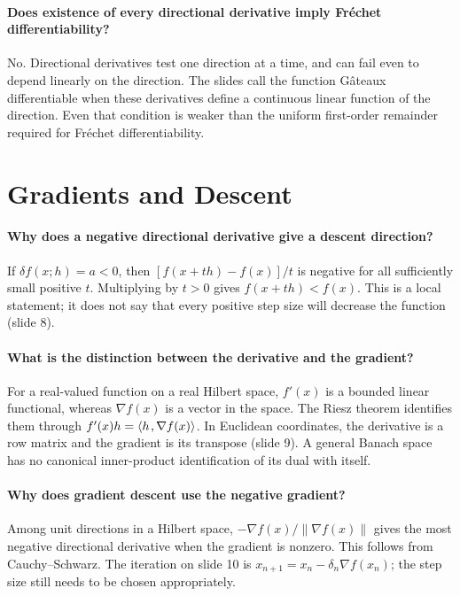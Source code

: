 \documentclass[10pt,english]{article}
\begin{document}
\paragraph{Does existence of every directional derivative imply Fr\'echet differentiability?}
No. Directional derivatives test one direction at a time, and can fail even to depend linearly on the direction.
The slides call the function G\^ateaux differentiable when these derivatives define a continuous linear function of the direction.
Even that condition is weaker than the uniform first-order remainder required for Fr\'echet differentiability.

\section{Gradients and Descent}

\paragraph{Why does a negative directional derivative give a descent direction?}
If $\delta f(x;h)=a<0$, then $[f(x+th)-f(x)]/t$ is negative for all sufficiently small positive $t$.
Multiplying by $t>0$ gives $f(x+th)<f(x)$.
This is a local statement; it does not say that every positive step size will decrease the function (slide 8).

\paragraph{What is the distinction between the derivative and the gradient?}
For a real-valued function on a real Hilbert space, $f'(x)$ is a bounded linear functional, whereas $\nabla f(x)$ is a vector in the space.
The Riesz theorem identifies them through $f'(x)h={\left\langle h \mskip2mu , \nabla f(x) \right\rangle}$.
In Euclidean coordinates, the derivative is a row matrix and the gradient is its transpose (slide 9).
A general Banach space has no canonical inner-product identification of its dual with itself.

\paragraph{Why does gradient descent use the negative gradient?}
Among unit directions in a Hilbert space, $-\nabla f(x)/\|\nabla f(x)\|$ gives the most negative directional derivative when the gradient is nonzero.
This follows from Cauchy--Schwarz.
The iteration on slide 10 is $x_{n+1}=x_n-\delta_n\nabla f(x_n)$; the step size still needs to be chosen appropriately.
\end{document}
